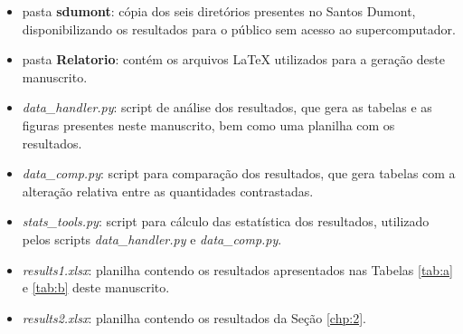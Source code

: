\begin{itemize}
\item pasta \textbf{sdumont}: cópia dos seis diretórios presentes no Santos Dumont, disponibilizando os resultados para o público sem acesso ao supercomputador.

\item pasta \textbf{Relatorio}: contém os arquivos \LaTeX  \hspace{0.09mm} utilizados para a geração deste manuscrito.

\item \textit{data\_handler.py}: script de análise dos resultados, que gera as tabelas e as figuras presentes neste manuscrito, bem como uma planilha com os resultados.

\item \textit{data\_comp.py}: script para comparação dos resultados, que gera tabelas com a alteração relativa entre as quantidades contrastadas.

\item \textit{stats\_tools.py}: script para cálculo das estatística dos resultados, utilizado pelos scripts \textit{data\_handler.py} e \textit{data\_comp.py}.

\item \textit{results1.xlsx}: planilha contendo os resultados apresentados nas Tabelas \ref{tab:a} e \ref{tab:b} deste manuscrito.

\item \textit{results2.xlsx}: planilha contendo os resultados da Seção \ref{chp:2}.
\end{itemize}